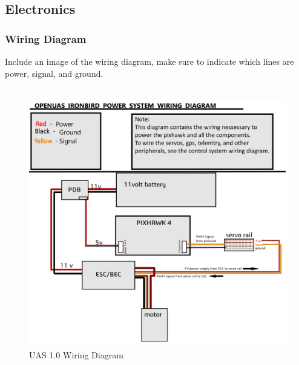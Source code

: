 \documentclass{article}
\begin{document}
\subsection*{Electronics}
\subsubsection*{Wiring Diagram}
Include an image of the wiring diagram, make sure to indicate which lines are power, signal, and ground. \\ \\
\begin{figure}[H]
	\includegraphics[width = \columnwidth]{UAS_1_0_Wiring.jpg}
	\caption{UAS 1.0 Wiring Diagram}
\end{figure}
\end{document}
